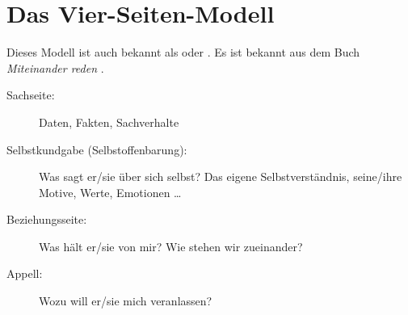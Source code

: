 \section{Das Vier-Seiten-Modell}

Dieses Modell ist auch bekannt als  oder . Es ist bekannt aus dem Buch \emph{Miteinander reden} \cite{miteinander-reden-1}.

\begin{description}
  \item[Sachseite:] Daten, Fakten, Sachverhalte
  \item[Selbstkundgabe (Selbstoffenbarung):] Was sagt er/sie über sich selbst? Das eigene Selbstverständnis, seine/ihre Motive, Werte, Emotionen \ldots
  \item[Beziehungsseite:] Was hält er/sie von mir? Wie stehen wir zueinander?
  \item[Appell:] Wozu will er/sie mich veranlassen?
\end{description}
